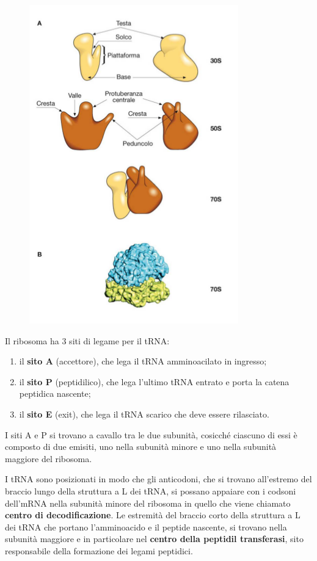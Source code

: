 \documentclass[11pt]{book}
\begin{document}
\begin{figure}[htp]
\centering
\includegraphics[scale=1.00]{img/56_Ribosoma.png}
\caption{}
\label{ribosoma}
\end{figure}

Il ribosoma ha 3 siti di legame per il tRNA:

\begin{enumerate}
\def\labelenumi{\arabic{enumi}.}
\itemsep1pt\parskip0pt
\item
  il \textbf{sito A} (accettore), che lega il tRNA amminoacilato in
  ingresso;
\item
  il \textbf{sito P} (peptidilico), che lega l'ultimo tRNA entrato e
  porta la catena peptidica nascente;
\item
  il \textbf{sito E} (exit), che lega il tRNA scarico che deve essere
  rilasciato.
\end{enumerate}

I siti A e P si trovano a cavallo tra le due subunità, cosicché ciascuno
di essi è composto di due emisiti, uno nella subunità minore e uno nella
subunità maggiore del ribosoma.

I tRNA sono posizionati in modo che gli anticodoni, che si trovano
all'estremo del braccio lungo della struttura a L dei tRNA, si possano
appaiare con i codsoni dell'mRNA nella subunità minore del ribosoma in
quello che viene chiamato \textbf{centro di decodificazione}. Le
estremità del braccio corto della struttura a L dei tRNA che portano
l'amminoacido e il peptide nascente, si trovano nella subunità maggiore
e in particolare nel \textbf{centro della peptidil transferasi}, sito
responsabile della formazione dei legami peptidici.
\end{document}
